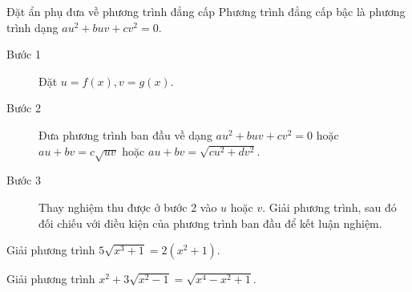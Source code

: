 \begin{dang}{Đặt ẩn phụ đưa về phương trình đẳng cấp}
 Phương trình đẳng cấp bậc là phương trình dạng $ au^2+buv+cv^2=0 $.
  		\begin{description}
  			\item[Bước 1] Đặt $ u=f(x), v=g(x)$.
  			\item[Bước 2] Đưa phương trình ban đầu về dạng $ au^2+buv+cv^2=0  $ hoặc $ au+bv=c\sqrt{uv} $ hoặc $ au+bv=\sqrt{cu^2+dv^2} $.
  			\item[Bước 3] Thay nghiệm thu được ở bước 2 vào $ u $ hoặc $ v $. Giải phương trình, sau đó đối  chiếu với điều kiện của phương trình ban đầu để kết luận nghiệm.
  		\end{description}
  \end{dang}

\begin{bt}%
  	Giải phương trình $ 5\sqrt{x^3+1}=2(x^2+1). $
\end{bt}

\begin{bt}%
  	Giải phương trình $ x^2+3\sqrt{x^2-1}=\sqrt{x^4-x^2+1}. $
\end{bt}

